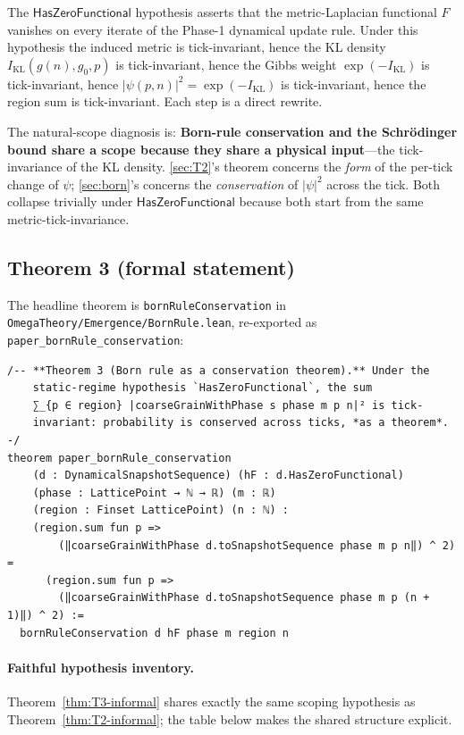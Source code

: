 \documentclass[11pt,a4paper,twoside]{article}
\theoremstyle{definition}
\newcommand{\KL}{I_{\mathrm{KL}}}
\newcommand{\HasZF}{\mathsf{HasZeroFunctional}}
\newcommand{\code}[1]{\texttt{#1}}
\begin{document}
The $\HasZF$ hypothesis asserts that the metric-Laplacian functional
$F$ vanishes on every iterate of the Phase-1 dynamical update rule.
Under this hypothesis the induced metric is tick-invariant, hence the
KL density $\KL(g(n),g_{0},p)$ is tick-invariant, hence the Gibbs
weight $\exp(-\KL)$ is tick-invariant, hence
$|\psi(p,n)|^{2}=\exp(-\KL)$ is tick-invariant, hence the region sum
is tick-invariant. Each step is a direct rewrite.

The natural-scope diagnosis is: \textbf{Born-rule conservation and the
Schr\"odinger bound share a scope because they share a physical
input}---the tick-invariance of the KL density.
\cref{sec:T2}'s theorem concerns the \emph{form} of the per-tick
change of $\psi$; \cref{sec:born}'s concerns the \emph{conservation}
of $|\psi|^{2}$ across the tick. Both collapse trivially under
$\HasZF$ because both start from the same metric-tick-invariance.

\subsection{Theorem 3 (formal statement)}\label{sec:T3}

The headline theorem is \code{bornRuleConservation} in
\code{OmegaTheory/Emergence/BornRule.lean}, re-exported as
\code{paper\_bornRule\_conservation}:
\begin{lstlisting}
/-- **Theorem 3 (Born rule as a conservation theorem).** Under the
    static-regime hypothesis `HasZeroFunctional`, the sum
    ∑_{p ∈ region} |coarseGrainWithPhase s phase m p n|² is tick-
    invariant: probability is conserved across ticks, *as a theorem*. -/
theorem paper_bornRule_conservation
    (d : DynamicalSnapshotSequence) (hF : d.HasZeroFunctional)
    (phase : LatticePoint → ℕ → ℝ) (m : ℝ)
    (region : Finset LatticePoint) (n : ℕ) :
    (region.sum fun p =>
        (‖coarseGrainWithPhase d.toSnapshotSequence phase m p n‖) ^ 2) =
      (region.sum fun p =>
        (‖coarseGrainWithPhase d.toSnapshotSequence phase m p (n + 1)‖) ^ 2) :=
  bornRuleConservation d hF phase m region n
\end{lstlisting}

\paragraph{Faithful hypothesis inventory.}
Theorem~\ref{thm:T3-informal} shares exactly the same scoping
hypothesis as Theorem~\ref{thm:T2-informal}; the table below makes
the shared structure explicit.
\end{document}
